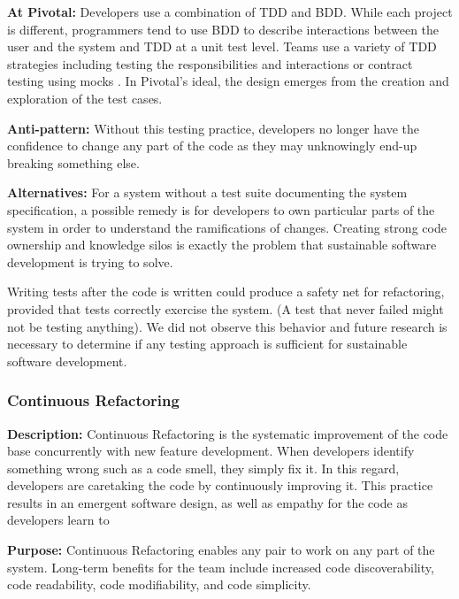 \textbf{At Pivotal:} Developers use a combination of TDD and BDD. While each project is different, programmers tend to use BDD to describe interactions between the user and the system and TDD at a unit test level. Teams use a variety of TDD strategies including testing the responsibilities and interactions \cite{Goose} or contract testing using mocks \cite{RainsbergerIntegrationTestsYouTube}. In Pivotal's ideal, the design emerges from the creation and exploration of the test cases. 

\textbf{Anti-pattern:} Without this testing practice, developers no longer have the confidence to change any part of the code as they may unknowingly end-up breaking something else. 

\textbf{Alternatives:} For a system without a test suite documenting the system specification, a possible remedy is for developers to own particular parts of the system in order to understand the ramifications of changes. Creating strong code ownership and knowledge silos is exactly the problem that sustainable software development is trying to solve.

Writing tests after the code is written could produce a safety net for refactoring, provided that tests correctly exercise the system. (A test that never failed might not be testing anything). We did not observe this behavior and future research is necessary to determine if any testing approach is sufficient for sustainable software development.

\subsubsection{Continuous Refactoring}
\textbf{Description:} Continuous Refactoring is the systematic improvement of the code base concurrently with new feature development. When developers identify something wrong such as a code smell, they simply fix it. In this regard, developers are caretaking the code by continuously improving it. This practice results in an emergent software design, as well as empathy for the code as developers learn to  


\textbf{Purpose:} Continuous Refactoring enables any pair to work on any part of the system. Long-term benefits for the team include increased code discoverability, code readability, code modifiability, and code simplicity. 

